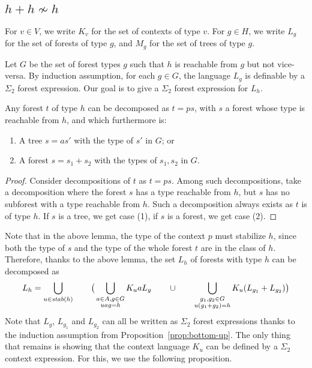 \documentclass{LMCS}
\begin{document}
\subsection{\texorpdfstring{$h + h \not \sim h$}{h+h notsim h}}
\label{sec:h-does-not-preserve-itself}

For $v \in V$, we write $K_v$ for the set of contexts of type $v$. For
$g \in H$, we write $L_g$ for the set of forests of type $g$, and
$M_g$ for the set of trees of type $g$.



Let $G$ be the set of forest types $g$ such that $h$ is reachable from
$g$ but not vice-versa.  By induction assumption,  for each $g \in G$,
the  language $L_g$
is definable by a $\Sigma_2$ forest expression. Our
goal is to give a $\Sigma_2$ forest expression for $L_h$.

\begin{lem}\label{lem:decompo-nonminim}
  Any forest $t$ of type $h$ can be decomposed as $t=ps$, with $s$ a
  forest whose type is  reachable from $h$, and which furthermore is:
\begin{enumerate}[\em(1)]
\item A tree $s=as'$ with the type of $s'$ in $G$; or
\item A forest $s=s_1+s_2$ with the types of $s_1,s_2$ in $G$.
\end{enumerate}
\end{lem}
\begin{proof}
  Consider decompositions of $t$ as $t=ps$. Among such decompositions,
  take a decomposition where the forest $s$ has a type reachable from
  $h$, but $s$ has no subforest with a type reachable from $h$. Such  a
  decomposition always exists as $t$ is of type $h$. If $s$
  is a tree, we get case (1), if $s$ is a forest, we get case (2).
\end{proof}

Note that in the above lemma, the type of the context $p$ must
stabilize $h$, since both the type of $s$ and the type of the whole
forest $t$ are in the class of $h$. Therefore, thanks to the above
lemma, the set $L_h$ of forests with type $h$ can be decomposed as
\begin{equation}
  \label{eq:lh-nonmaximal-decomp}
    L_h = \bigcup_{u \in \mathit{stab}(h)}\qquad \big(\bigcup_{\substack{a \in A, g \in G\\
      uag=h}} K_uaL_g \qquad \cup \qquad  \bigcup_{\substack{g_1,g_2 \in G\\
      u(g_1+g_2)=h}} K_u(L_{g_1} + L_{g_2}) \big)
\end{equation}
Note that $L_g$, $L_{g_1}$ and $L_{g_2}$ can all be written as
$\Sigma_2$ forest expressions thanks to the induction assumption from
Proposition~\ref{prop:bottom-up}.  The only thing that remains is
showing that the context language $K_u$ can be defined by a $\Sigma_2$
context expression.  For this, we use the following proposition.
\end{document}

